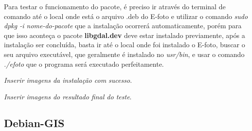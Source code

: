 Para testar o funcionamento do pacote, é preciso ir através do terminal de comando até o local onde está o arquivo .deb do E-foto e utilizar o comando \textit{sudo dpkg -i nome-do-pacote} que a instalação ocorrerá automaticamente, porém para que isso aconteça o pacote \textbf{libgdal.dev} deve estar instalado previamente, após a instalação ser concluída, basta ir até o local onde foi instalado o E-foto, buscar o seu arquivo executável, que geralmente é instalado no \textit{usr/bin}, e usar o comando \textit{./efoto} que o programa será executado perfeitamente.

\textit{Inserir imagens da instalação com sucesso}.

\textit{Inserir imagens do resultado final do teste}.

\subsection{Debian-GIS}
